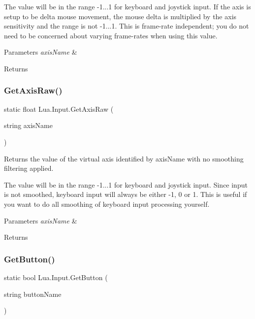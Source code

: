 The value will be in the range -\/1...1 for keyboard and joystick input. If the axis is setup to be delta mouse movement, the mouse delta is multiplied by the axis sensitivity and the range is not -\/1...1. This is frame-\/rate independent; you do not need to be concerned about varying frame-\/rates when using this value. 
\begin{DoxyParams}{Parameters}
{\em axis\+Name} & \\
\hline
\end{DoxyParams}
\begin{DoxyReturn}{Returns}

\end{DoxyReturn}
\mbox{\label{class_lua_1_1_input_aa25e7d2e0c828c4661e8a77db269e5b3}} 
\subsubsection{\texorpdfstring{GetAxisRaw()}{GetAxisRaw()}}
{\footnotesize\ttfamily static float Lua.\+Input.\+Get\+Axis\+Raw (\begin{DoxyParamCaption}\item[{string}]{axis\+Name }\end{DoxyParamCaption})\hspace{0.3cm}{\ttfamily [static]}}



Returns the value of the virtual axis identified by axis\+Name with no smoothing filtering applied. 

The value will be in the range -\/1...1 for keyboard and joystick input. Since input is not smoothed, keyboard input will always be either -\/1, 0 or 1. This is useful if you want to do all smoothing of keyboard input processing yourself. 
\begin{DoxyParams}{Parameters}
{\em axis\+Name} & \\
\hline
\end{DoxyParams}
\begin{DoxyReturn}{Returns}

\end{DoxyReturn}
\mbox{\label{class_lua_1_1_input_ac45bfbc1aaa71822f9dd32ee446e3e26}} 
\subsubsection{\texorpdfstring{GetButton()}{GetButton()}}
{\footnotesize\ttfamily static bool Lua.\+Input.\+Get\+Button (\begin{DoxyParamCaption}\item[{string}]{button\+Name }\end{DoxyParamCaption})\hspace{0.3cm}{\ttfamily [static]}}



